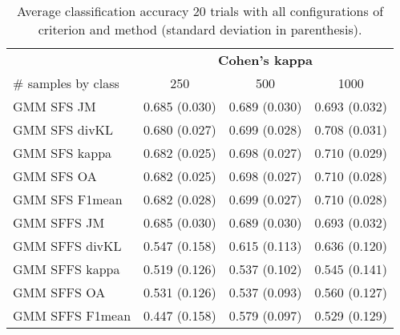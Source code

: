 \documentclass[a4paper,10pt,DIV=16]{scrartcl}
\begin{document}
    \begin{table}[!t]
        \centering
        \caption{Average classification accuracy 20 trials with all configurations of criterion and method (standard deviation in parenthesis).\label{tab:aisa-otbsimu-all}}
        \begin{tabular}{lccc}\toprule
             & \multicolumn{3}{c}{\bfseries Cohen's kappa} \\ \cmidrule{2-4}
            \# samples by class & 250 & 500 & 1000 \\ \midrule

            GMM SFS JM &      0.685 (0.030) & 0.689 (0.030) & 0.693 (0.032) \\
            GMM SFS divKL &   0.680 (0.027) & 0.699 (0.028) & 0.708 (0.031) \\
            GMM SFS kappa &   0.682 (0.025) & 0.698 (0.027) & 0.710 (0.029) \\
            GMM SFS OA &      0.682 (0.025) & 0.698 (0.027) & 0.710 (0.028) \\
            GMM SFS F1mean &  0.682 (0.028) & 0.699 (0.027) & 0.710 (0.028) \\
            GMM SFFS JM &     0.685 (0.030) & 0.689 (0.030) & 0.693 (0.032) \\
            GMM SFFS divKL &  0.547 (0.158) & 0.615 (0.113) & 0.636 (0.120) \\
            GMM SFFS kappa &  0.519 (0.126) & 0.537 (0.102) & 0.545 (0.141) \\
            GMM SFFS OA &     0.531 (0.126) & 0.537 (0.093) & 0.560 (0.127) \\
            GMM SFFS F1mean & 0.447 (0.158) & 0.579 (0.097) & 0.529 (0.129) \\
            \bottomrule
        \end{tabular}
    \end{table}
\end{document}
